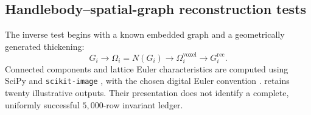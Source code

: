 \documentclass[10pt,twocolumn]{article}
\begin{document}
\subsection{Handlebody--spatial-graph reconstruction tests}
\label{supp:handlebody_validation}
The inverse test begins with a known embedded graph and a geometrically generated thickening:
\begin{equation}
G_i\longrightarrow\Omega_i=N(G_i)\longrightarrow\Omega_i^{\mathrm{voxel}}\longrightarrow G_i^{\mathrm{rec}}.
\label{suppeq:ground_truth_recovery}
\end{equation}
Connected components and lattice Euler characteristics are computed using SciPy and \texttt{scikit-image} \cite{kg_virtanen2020scipy,kg_vanderwalt2014skimage}, with the chosen digital Euler convention \cite{kg_ohser2002euler}.  retains twenty illustrative outputs. Their presentation does not identify a complete, uniformly successful $5{,}000$-row invariant ledger.
\end{document}
